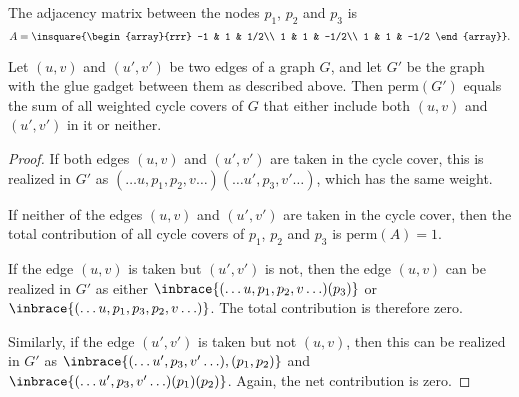 \begin{center}
\end{center}
The adjacency matrix between the nodes $p_1$, $p_2$ and $p_3$ is
\[
A = \insquare{\begin{array}{rrr}
-1 & 1 & 1/2\\
1 & 1 & -1/2\\
1 & 1 & -1/2
\end{array}}.
\]

\noindent
\begin{claim}
Let $(u,v)$ and $(u',v')$ be two edges of a graph $G$, and let $G'$ be the graph with the glue gadget between them as described above.
Then $\mathrm{perm}(G')$ equals the sum of all weighted cycle covers of $G$ that either include both $(u,v)$ and $(u',v')$ in it or neither.
\end{claim}
\begin{proof}
If both edges $(u,v)$ and $(u',v')$ are taken in the cycle cover, this is realized in $G'$ as ${(\ldots u,p_1, p_2, v \ldots) (\ldots u', p_3, v' \ldots)}$, which has the same weight.

If neither of the edges $(u,v)$ and $(u',v')$ are taken in the cycle cover, then the total contribution of all cycle covers of $p_1$, $p_2$ and $p_3$ is $\mathrm{perm}(A) = 1$.

If the edge $(u,v)$ is taken but $(u',v')$ is not, then the edge $(u,v)$ can be realized in $G'$ as either $\inbrace{(\ldots u,p_1,p_2,v \ldots) (p_3)}$ or $\inbrace{(\ldots u,p_1,p_3,p_2,v \ldots )}$.
The total contribution is therefore zero.

Similarly, if the edge $(u',v')$ is taken but not $(u,v)$, then this can be realized in $G'$ as $\inbrace{(\ldots u',p_3,v' \ldots),(p_1,p_2)}$ and $\inbrace{(\ldots u',p_3, v' \ldots) (p_1) (p_2)}$.
Again, the net contribution is zero.
\end{proof}


